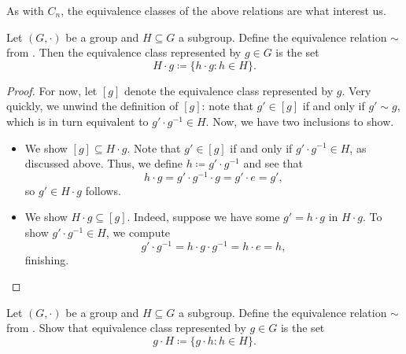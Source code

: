 \documentclass[../notes.tex]{subfiles}
\begin{document}
As with $C_n$, the equivalence classes of the above relations are what interest us.
\begin{lemma}
    Let $(G,\cdot)$ be a group and $H\subseteq G$ a subgroup. Define the equivalence relation $\sim$ from . Then the equivalence class represented by $g\in G$ is the set
    \[H\cdot g\coloneqq\{h\cdot g:h\in H\}.\]
\end{lemma}
\begin{proof}
    For now, let $[g]$ denote the equivalence class represented by $g$. Very quickly, we unwind the definition of $[g]$: note that $g'\in[g]$ if and only if $g'\sim g$, which is in turn equivalent to $g'\cdot g^{-1}\in H$. Now, we have two inclusions to show.
    \begin{itemize}
        \item We show $[g]\subseteq H\cdot g$. Note that $g'\in[g]$ if and only if $g'\cdot g^{-1}\in H$, as discussed above. Thus, we define $h\coloneqq g'\cdot g^{-1}$ and see that
        \[h\cdot g=g'\cdot g^{-1}\cdot g=g'\cdot e=g',\]
        so $g'\in H\cdot g$ follows.
        \item We show $H\cdot g\subseteq[g]$. Indeed, suppose we have some $g'=h\cdot g$ in $H\cdot g$. To show $g'\cdot g^{-1}\in H$, we compute
        \[g'\cdot g^{-1}=h\cdot g\cdot g^{-1}=h\cdot e=h,\]
        finishing.
        \qedhere
    \end{itemize}
\end{proof}
\begin{exe} \label{exe:define-left-coset}
    Let $(G,\cdot)$ be a group and $H\subseteq G$ a subgroup. Define the equivalence relation $\sim$ from . Show that equivalence class represented by $g\in G$ is the set
    \[g\cdot H\coloneqq\{g\cdot h:h\in H\}.\]
\end{exe}
\end{document}
